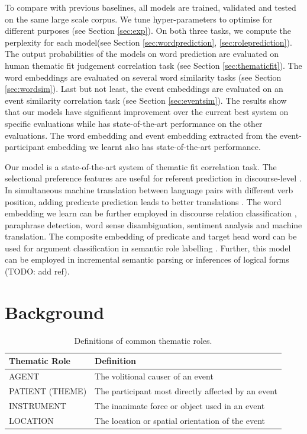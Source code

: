 \documentclass[a4paper]{article}
\begin{document}
To compare with previous baselines, all models are trained, validated and tested on the same large scale corpus. We tune hyper-parameters to optimise for different purposes (see Section \ref{sec:exp}). On both three tasks, we compute the perplexity for each model(see Section \ref{sec:wordprediction}, \ref{sec:roleprediction}). The output probabilities of the models on word prediction are evaluated on human thematic fit judgement correlation task (see Section \ref{sec:thematicfit}). The word embeddings are evaluated on several word similarity tasks (see Section \ref{sec:wordsim}). Last but not least, the event embeddings are evaluated on an event similarity correlation task (see Section \ref{sec:eventsim}). The results show that our models have significant improvement over the current best system on specific evaluations while has state-of-the-art performance on the other evaluations. The word embedding and event embedding extracted from the event-participant embedding we learnt also has state-of-the-art performance. 

Our model is a state-of-the-art system of thematic fit correlation task. The selectional preference features are useful for referent prediction in discourse-level \citep{modi2017modeling}. In simultaneous machine translation between language pairs with different verb position, adding predicate prediction leads to better translations \citep{grissom2014don}. The word embedding we learn can be further employed in discourse relation classification \citep{shi2017need, rutherford2017systematic}, paraphrase detection, word sense disambiguation, sentiment analysis and machine translation. The composite embedding of predicate and target head word can be used for argument classification in semantic role labelling \citep{roth2016neural}. Further, this model can be employed in incremental semantic parsing \citep{konstas2014incremental, konstas2015semantic} or inferences of logical forms (TODO: add ref). 



\newpage
\section{Background}


\begin{table}[t]
\centering
\begin{tabular}{l|l}
\textbf{Thematic Role}  &   \textbf{Definition} \\ \hline
AGENT                   &   The volitional causer of an event \\
PATIENT (THEME)         &   The participant most directly affected by an event \\
INSTRUMENT              &   The inanimate force or object used in an event \\
LOCATION                &   The location or spatial orientation of the event \\
\end{tabular}
\caption{\label{tab:thematic} Definitions of common thematic roles.}
\end{table}
\end{document}
